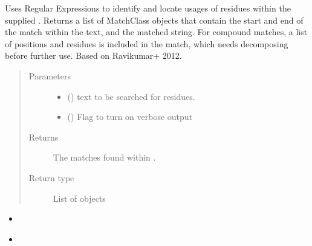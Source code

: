 \documentclass[letterpaper,10pt,english]{sphinxmanual}
\begin{document}
\begin{fulllineitems}
\label{\detokenize{functions:pyresid.identify_residues}}
Uses Regular Expressions to identify and locate usages of residues within the supplied . Returns a
list of MatchClass objects that contain the start and end of the match within the text, and the matched string.
For compound matches, a list of positions and residues is included in the match, which needs decomposing before
further use.
Based on Ravikumar+ 2012.
\begin{quote}\begin{description}
\item[{Parameters}] \leavevmode\begin{itemize}
\item {} 
 () \textendash{} text to be searched for residues.

\item {} 
 (\sphinxstyleliteralemphasis{\sphinxupquote{, }}\sphinxstyleliteralemphasis{\sphinxupquote{, }}) \textendash{} Flag to turn on verbose output

\end{itemize}

\item[{Returns}] \leavevmode
{} \textendash{} The matches found within .

\item[{Return type}] \leavevmode
List of {\hyperref[\detokenize{classes:pyresid.MatchClass}]{}} objects

\end{description}\end{quote}



\begin{itemize}
\item {} 
{\hyperref[\detokenize{functions:pyresid.locate_residues}]{}}

\item {} 
{\hyperref[\detokenize{functions:pyresid.process}]{}}

\end{itemize}



\end{fulllineitems}
\end{document}
